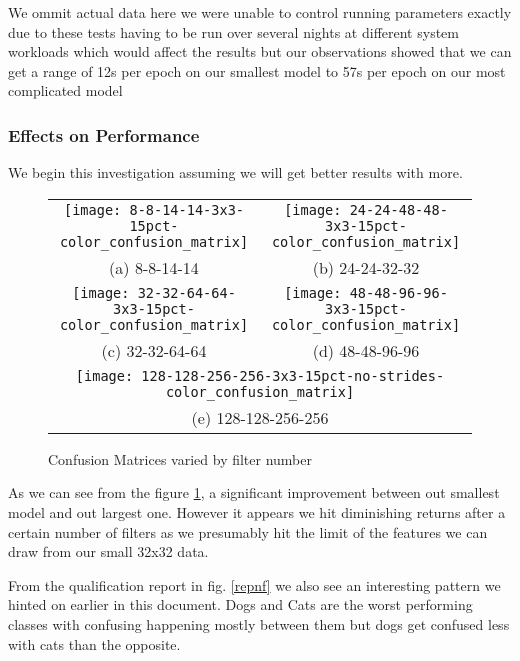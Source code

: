 We ommit actual data here we were unable to control running parameters exactly due to these tests having to be run over several nights at different system workloads which would affect the results but our observations showed that we can get a range of 12s per epoch on our smallest model to 57s per epoch on our most complicated model
\subsubsection{Effects on Performance}
We begin this investigation assuming we will get better results with more. 
\begin{figure}[h!]
	\begin{tabular}{cc}
		\texttt{[image: 8-8-14-14-3x3-15pct-color\_confusion\_matrix]} &   \texttt{[image: 24-24-48-48-3x3-15pct-color\_confusion\_matrix]} \\
		(a) 8-8-14-14 & (b) 24-24-32-32 \\[6pt]
		\texttt{[image: 32-32-64-64-3x3-15pct-color\_confusion\_matrix]} &   \texttt{[image: 48-48-96-96-3x3-15pct-color\_confusion\_matrix]} \\
		(c) 32-32-64-64 & (d) 48-48-96-96 \\[6pt]
		\multicolumn{2}{c}{\texttt{[image: 128-128-256-256-3x3-15pct-no-strides-color\_confusion\_matrix]} }\\
		\multicolumn{2}{c}{(e) 128-128-256-256}
	\end{tabular}
	\caption{Confusion Matrices varied by filter number}
	\label{confnf}
\end{figure}

As we can see from the figure \ref{confnf}, a significant improvement between out smallest model and out largest one. However it appears we hit diminishing returns after a certain number of filters as we presumably hit the limit of the features we can draw from our small 32x32 data.

From the qualification report in fig. \ref{repnf} we also see an interesting pattern we hinted on earlier in this document. Dogs and Cats are the worst performing classes with confusing happening mostly between them but dogs get confused less with cats than the opposite.

